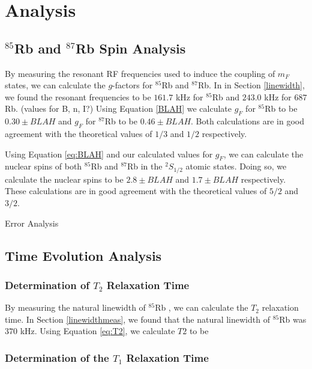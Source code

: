 
\section{Analysis}\label{analysis}

\subsection{$^{85}$Rb and $^{87}$Rb Spin Analysis}

By measuring the resonant RF frequencies used to induce the coupling of $m_F$ states, we can calculate the $g$-factors for $^{85}$Rb and $^{87}$Rb.  In in Section \ref{linewidth}, we found the resonant frequencies to be $161.7$ kHz for $^{85}$Rb and $243.0$ kHz for $6{87}$Rb.  (values for B, n, I?) Using Equation \ref{BLAH} we calculate $g_F$ for $^{85}$Rb to be $0.30\pm BLAH$ and $g_F$ for $^{87}$Rb to be $0.46\pm BLAH$.  Both calculations are in good agreement with the theoretical values of $1/3$ and $1/2$ respectively. 

Using Equation \ref{eq:BLAH} and our calculated values for $g_F$, we can calculate the nuclear spins of both $^{85}$Rb and $^{87}$Rb in the $^{2}S_{1/2}$ atomic states.  Doing so, we calculate the nuclear spins to be $2.8 \pm BLAH$ and $1.7 \pm BLAH$ respectively.  These calculations are in good agreement with the theoretical values of $5/2$ and $3/2$.

Error Analysis

\subsection{Time Evolution Analysis}

\subsubsection{Determination of $T_{2}$ Relaxation Time}

By measuring the natural linewidth of $^{85}$Rb , we can calculate the $T_2$ relaxation time.  In Section \ref{linewidthmeas}, we found that the natural linewidth of $^{85}$Rb was $370$ kHz.  Using Equation \ref{eq:T2}, we calculate $T2$ to be 


\subsubsection{Determination of the $T_{1}$ Relaxation Time}

